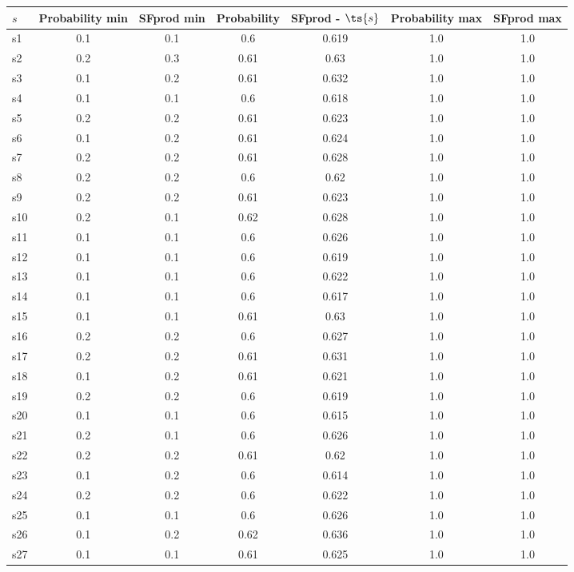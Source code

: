 \documentclass{article}
\begin{document}
\noindent\begin{tabular}{|l|c|c|c|c|c|c|}
\hline
$s$& Probability min & SFprod min & Probability & SFprod - $\ts{s}$ & Probability max & SFprod max\\
\hline
s1 &0.1 & 0.1 & 0.6 & 0.619 & 1.0 & 1.0\\
\hline
s2 &0.2 & 0.3 & 0.61 & 0.63 & 1.0 & 1.0\\
\hline
s3 &0.1 & 0.2 & 0.61 & 0.632 & 1.0 & 1.0\\
\hline
s4 &0.1 & 0.1 & 0.6 & 0.618 & 1.0 & 1.0\\
\hline
s5 &0.2 & 0.2 & 0.61 & 0.623 & 1.0 & 1.0\\
\hline
s6 &0.1 & 0.2 & 0.61 & 0.624 & 1.0 & 1.0\\
\hline
s7 &0.2 & 0.2 & 0.61 & 0.628 & 1.0 & 1.0\\
\hline
s8 &0.2 & 0.2 & 0.6 & 0.62 & 1.0 & 1.0\\
\hline
s9 &0.2 & 0.2 & 0.61 & 0.623 & 1.0 & 1.0\\
\hline
s10 &0.2 & 0.1 & 0.62 & 0.628 & 1.0 & 1.0\\
\hline
s11 &0.1 & 0.1 & 0.6 & 0.626 & 1.0 & 1.0\\
\hline
s12 &0.1 & 0.1 & 0.6 & 0.619 & 1.0 & 1.0\\
\hline
s13 &0.1 & 0.1 & 0.6 & 0.622 & 1.0 & 1.0\\
\hline
s14 &0.1 & 0.1 & 0.6 & 0.617 & 1.0 & 1.0\\
\hline
s15 &0.1 & 0.1 & 0.61 & 0.63 & 1.0 & 1.0\\
\hline
s16 &0.2 & 0.2 & 0.6 & 0.627 & 1.0 & 1.0\\
\hline
s17 &0.2 & 0.2 & 0.61 & 0.631 & 1.0 & 1.0\\
\hline
s18 &0.1 & 0.2 & 0.61 & 0.621 & 1.0 & 1.0\\
\hline
s19 &0.2 & 0.2 & 0.6 & 0.619 & 1.0 & 1.0\\
\hline
s20 &0.1 & 0.1 & 0.6 & 0.615 & 1.0 & 1.0\\
\hline
s21 &0.2 & 0.1 & 0.6 & 0.626 & 1.0 & 1.0\\
\hline
s22 &0.2 & 0.2 & 0.61 & 0.62 & 1.0 & 1.0\\
\hline
s23 &0.1 & 0.2 & 0.6 & 0.614 & 1.0 & 1.0\\
\hline
s24 &0.2 & 0.2 & 0.6 & 0.622 & 1.0 & 1.0\\
\hline
s25 &0.1 & 0.1 & 0.6 & 0.626 & 1.0 & 1.0\\
\hline
s26 &0.1 & 0.2 & 0.62 & 0.636 & 1.0 & 1.0\\
\hline
s27 &0.1 & 0.1 & 0.61 & 0.625 & 1.0 & 1.0\\

\end{tabular}
\end{document}
